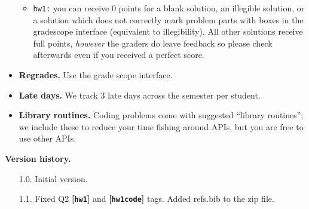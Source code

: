 \documentclass{article}
\def\hw{\textbf{[\texttt{hw1}]}\xspace}
\def\hwcode{\textbf{[\texttt{hw1code}]}\xspace}
\theoremstyle{definition}
\theoremstyle{remark}
\begin{document}
\begin{itemize}
\begin{itemize}
        \item
          \texttt{hw1:} you can receive $0$ points for a blank solution, an illegible solution,
          or a solution which does not correctly mark problem parts with boxes in the gradescope
          interface (equivalent to illegibility).
          All other solutions receive full points, \emph{however} the graders do leave feedback
          so please check afterwards even if you received a perfect score.

      \end{itemize}

    \item
      \textbf{Regrades.}  Use the grade scope interface.

    \item
      \textbf{Late days.}
      We track 3 late days across the semester per student.

    \item
      \textbf{Library routines.}
      Coding problems come with suggested ``library routines''; we include these to reduce
      your time fishing around APIs, but you are free to use other APIs.
  \end{itemize}
  \noindent\textbf{Version history.}
  \begin{enumerate}
    \item[1.0.] Initial version.
    \item[1.1.] Fixed Q2 \hw and \hwcode tags. Added refs.bib to the zip file.
  \end{enumerate}
\end{document}
